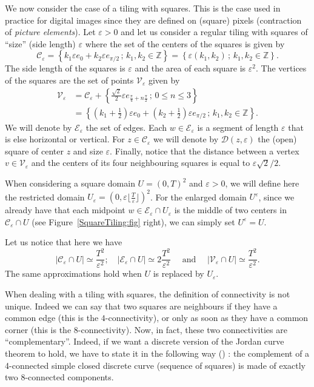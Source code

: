 \documentclass[10pt]{amsart}
\theoremstyle{definition}\newtheorem{defi}[theo]{Definition}\newtheorem{rema}[theo]{Remark}\newtheorem{exam}[theo]{Example}\newtheorem{exem}[theo]{Example}\newtheorem{nota}[theo]{Notation}
\newcommand{\Z}{\mathbb{Z}}
\newcommand{\eps}{\varepsilon}
\newcommand{\calC}{\mathcal{C}}
\newcommand{\calV}{\mathcal{V}}
\newcommand{\calD}{\mathcal{D}}
\newcommand{\calE}{\mathcal{E}}
\begin{document}
We now consider the case of a tiling with squares. This is the case used in practice for digital images since they are defined on (square) pixels (contraction of \emph{picture elements}). Let $\eps>0$ and let us consider a regular tiling with squares of ``size'' (side length) $\eps$ where the set of the centers of the squares is given by
\[
\calC_\eps = \left\{ k_1 \eps e_0 + k_2 \eps e_{\pi/2} \, ; \, k_1, k_2
\in \Z \right\} = \left\{ \eps (k_1,k_2) \, ; \, k_1, k_2 \in \Z \right\}.
\]
The side length of the squares is $\eps$ and the area of each square is $\eps^2$. The vertices of the squares are the set of points $\calV_\eps$ given by
\begin{align*}
\calV_\eps &= \calC_\eps + \left\{ \frac{\sqrt{2}}{2}\eps e_{\frac{\pi}{4} + n
\frac{\pi}{2}} \, ; \, 0\leq n \leq 3 \right\} \\
&= \left\{ \left(k_1 +\frac{1}{2}\right)
\eps e_0 + \left(k_2 +\frac{1}{2}\right) \eps e_{\pi/2} \, ; \, k_1, k_2 \in \Z \right\}.
\end{align*}
We will denote by $\calE_\eps$ the set of edges. Each $w\in\calE_\eps$ is a segment of length $\eps$ that is else horizontal or vertical. For $z\in
\calC_\eps$ we will denote by $\calD(z,\eps)$ the (open) square of center $z$ and size $\eps$. Finally, notice that the distance between a vertex $v\in\calV_\eps$ and the centers of its four neighbouring squares is equal to $\eps\sqrt{2}/2$.



When considering a square domain $U=(0,T)^2$ and $\eps>0$, we will define here the restricted domain $U_\eps=(0,\eps \lfloor
\tfrac{T}{\eps}\rfloor)^2$. For the enlarged domain $U^\eps$, since we already have that each midpoint $w\in \calE_\eps \cap U_\eps$ is the middle of two centers in ${\calC}_\eps\cap U$ (see Figure~\ref{SquareTiling:fig} right), we can simply set $U^\eps=U$.

Let us notice that here we have
\[
\left|\calC_\eps\cap U\right|\simeq \frac{T^2}{\eps^2} ; \quad\left|\calE_\eps\cap U\right|\simeq 2 \frac{T^2}{\eps^2}
\quad \text{ and } \quad \left|\calV_\eps\cap U\right|\simeq \frac{T^2}{\eps^2}.
\]
The same approximations hold when $U$ is replaced by $U_\eps$.


When dealing with a tiling with squares, the definition of connectivity is not unique. Indeed we can say that two squares are neighbours if they have a common edge (this is the $4$-connectivity), or only as soon as they have a common corner (this is the $8$-connectivity). Now, in fact, these two connectivities are ``complementary''. Indeed, if we want a discrete version of the Jordan curve theorem to hold, we have to state it in the following way (\cite{Rosenfeld79}) : the complement of a 4-connected simple closed discrete curve (sequence of squares) is made of exactly two 8-connected components.
\end{document}
